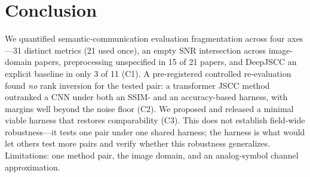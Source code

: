 \documentclass[conference]{IEEEtran}
\begin{document}
\section{Conclusion}\label{sec:conc}
We quantified semantic-communication evaluation fragmentation across four axes---31
distinct metrics (21 used once), an empty SNR intersection across image-domain papers,
preprocessing unspecified in 15 of 21 papers, and DeepJSCC an explicit baseline in only
3 of 11 (C1). A pre-registered controlled re-evaluation found \emph{no} rank inversion for
the tested pair: a transformer JSCC method outranked a CNN under both an SSIM- and an
accuracy-based harness, with margins well beyond the noise floor (C2). We proposed and
released a minimal viable harness that restores comparability (C3). This does not
establish field-wide robustness---it tests one pair under one shared harness; the harness
is what would let others test more pairs and verify whether this robustness generalizes.
Limitations: one method pair, the image domain, and an analog-symbol channel approximation.



\end{document}
